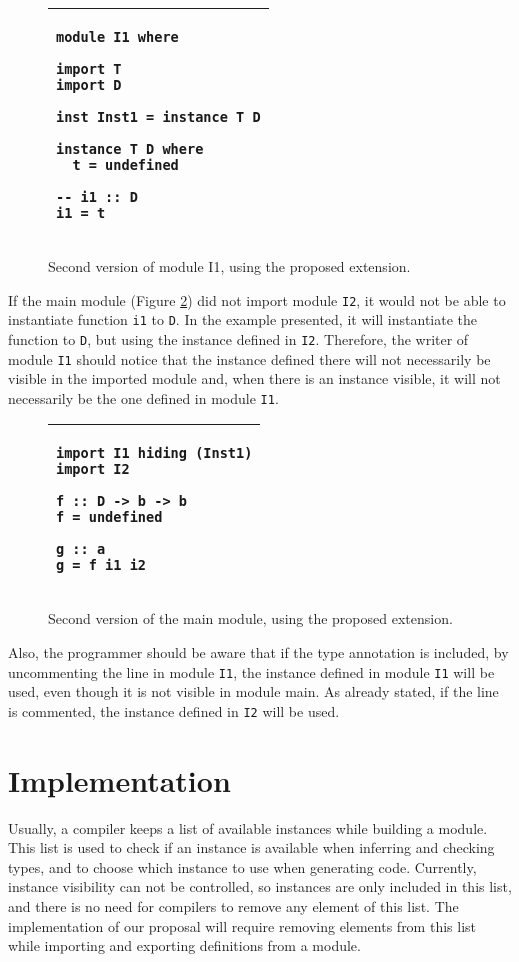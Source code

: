 \documentclass[msc]{ppgccufmg}
\begin{document}
\begin{figure}
\caption{Second version of module I1, using the proposed extension.\label{I1-2}}
\begin{tabular}{|p{\textwidth}|}
\hline
\begin{verbatim}
module I1 where

import T
import D

inst Inst1 = instance T D

instance T D where
  t = undefined

-- i1 :: D
i1 = t
\end{verbatim}
\\
\hline
\end{tabular}
\end{figure}

If the main module (Figure \ref{main-2})
did not import module \texttt{I2}, it would not be able to instantiate function
\texttt{i1} to \texttt{D}.  In the example presented, it will instantiate the
function to \texttt{D}, but using the instance defined in \texttt{I2}.
Therefore, the writer of module \texttt{I1} should notice that the instance
defined there will not necessarily be visible in the imported module and, when
there is an instance visible, it will not necessarily be the one defined in
module \texttt{I1}.

\begin{figure}
\caption{Second version of the main module, using the proposed
  extension.\label{main-2}}
\begin{tabular}{|p{\textwidth}|}
\hline
\begin{verbatim}
import I1 hiding (Inst1)
import I2

f :: D -> b -> b
f = undefined

g :: a
g = f i1 i2
\end{verbatim}
\\
\hline
\end{tabular}
\end{figure}

Also, the programmer should be aware that if the type annotation is
included, by uncommenting the line in module \texttt{I1}, the instance
defined in module \texttt{I1} will be used, even though it is not
visible in module main.  As already stated, if the line is commented,
the instance defined in \texttt{I2} will be used.

\section{Implementation}
Usually, a compiler keeps a list of available instances while building a
module.  This list is used to check if an instance is available when inferring and
checking types, and to choose which instance to use when generating code.
Currently, instance visibility can not be controlled, so instances are only
included in this list, and there is no need for compilers to remove any element
of this list.  The implementation of our proposal will require removing
elements from this list while importing and exporting definitions from a module.
\end{document}

